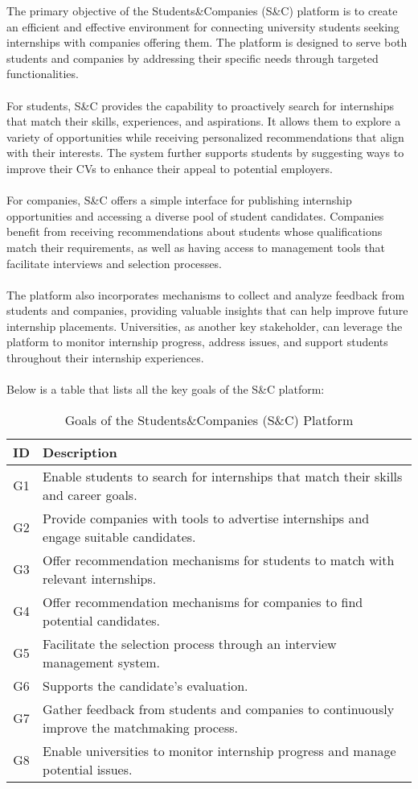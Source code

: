 The primary objective of the Students\&Companies (S\&C) platform is to create an efficient and effective environment for connecting university students seeking internships with companies offering them. The platform is designed to serve both students and companies by addressing their specific needs through targeted functionalities. \\ \\
For students, S\&C provides the capability to proactively search for internships that match their skills, experiences, and aspirations. It allows them to explore a variety of opportunities while receiving personalized recommendations that align with their interests. The system further supports students by suggesting ways to improve their CVs to enhance their appeal to potential employers. \\ \\
For companies, S\&C offers a simple interface for publishing internship opportunities and accessing a diverse pool of student candidates. Companies benefit from receiving recommendations about students whose qualifications match their requirements, as well as having access to management tools that facilitate interviews and selection processes. \\ \\
The platform also incorporates mechanisms to collect and analyze feedback from students and companies, providing valuable insights that can help improve future internship placements. Universities, as another key stakeholder, can leverage the platform to monitor internship progress, address issues, and support students throughout their internship experiences. \\ \\
Below is a table that lists all the key goals of the S\&C platform:
\begin{table}[h!]
\renewcommand{\arraystretch}{1.8}
\centering
\begin{tabular}{|c|p{12cm}|}
\hline
\textbf{ID} & \textbf{Description} \\ \hline
G1 & Enable students to search for internships that match their skills and career goals. \\ \hline
G2 & Provide companies with tools to advertise internships and engage suitable candidates. \\ \hline
G3 & Offer recommendation mechanisms for students to match with relevant internships. \\ \hline
G4 & Offer recommendation mechanisms for companies to find potential candidates.\\ \hline
G5 &  Facilitate the selection process through an interview management system. \\ \hline
G6 & Supports the candidate's evaluation.\\ \hline
G7 & Gather feedback from students and companies to continuously improve the matchmaking process. \\ \hline
G8 & Enable universities to monitor internship progress and manage potential issues. \\ \hline
\end{tabular}
\caption{Goals of the Students\&Companies (S\&C) Platform}
\end{table}

